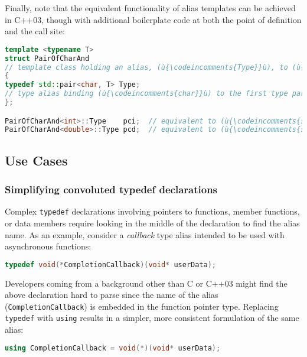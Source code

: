 \noindent Finally, note that the equivalent functionality of alias templates can be
achieved in C++03, though with additional boilerplate code at both the
point of definition and the call site:

\begin{lstlisting}[language=C++]
template <typename T>
struct PairOfCharAnd
// template class holding an alias, (ù{\codeincomments{Type}}ù), to (ù{\codeincomments{std::pair<char, T>}}ù)
{
typedef std::pair<char, T> Type;
// type alias binding (ù{\codeincomments{char}}ù) to the first type parameter of (ù{\codeincomments{std::pair}}ù)
};

PairOfCharAnd<int>::Type    pci;  // equivalent to (ù{\codeincomments{std::pair<char, int> pci;}}ù)
PairOfCharAnd<double>::Type pcd;  // equivalent to (ù{\codeincomments{std::pair<char, double> pcd;}}ù)
\end{lstlisting}


\subsection[Use Cases]{Use Cases}\label{use-cases}

\subsubsection[Simplifying convoluted {\tt typedef} declarations]{Simplifying convoluted {\SubsubsecCode typedef} declarations}\label{simplifying-convoluted-typedef-declarations}

Complex \texttt{typedef} declarations involving pointers to functions,
member functions, or data members require looking in the middle of the
declaration to find the alias name. As an example, consider a
\emph{callback} type alias intended to be used with asynchronous functions:

\begin{lstlisting}[language=C++]
typedef void(*CompletionCallback)(void* userData);
\end{lstlisting}

\noindent Developers coming from a background other than C or C++03 might find the
above declaration hard to parse since the name of the alias
(\texttt{CompletionCallback}) is embedded in the function pointer type.
Replacing \texttt{typedef} with \texttt{using} results in a simpler,
more consistent formulation of the same alias:

\begin{lstlisting}[language=C++]
using CompletionCallback = void(*)(void* userData);
\end{lstlisting}


